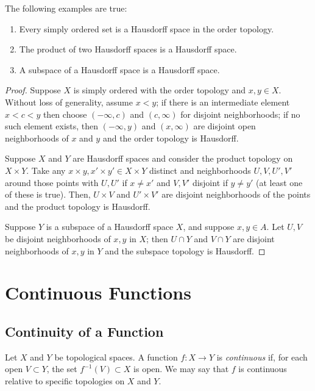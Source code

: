 \documentclass[10pt]{report}
\begin{document}
\begin{theorem}
  The following examples are true:
  \begin{enumerate}[label={(\alph*)}]
    \item Every simply ordered set is a Hausdorff space in the order topology.
    \item The product of two Hausdorff spaces is a Hausdorff space.
    \item A subspace of a Hausdorff space is a Hausdorff space.
 \end{enumerate}
\end{theorem}
\begin{proof}
  Suppose $X$ is simply ordered with the order topology and $x,y \in X$.
  Without loss of generality, assume $x < y$; if there is an intermediate element $x < c < y$ then choose $(-\infty,c)$ and $(c,\infty)$ for disjoint neighborhoods; if no such element exists, then $(-\infty,y)$ and $(x,\infty)$ are disjoint open neighborhoods of $x$ and $y$ and the order topology is Hausdorff.

  Suppose $X$ and $Y$ are Hausdorff spaces and consider the product topology on $X \times Y$.
  Take any $x \times y , x' \times y' \in X \times Y$ distinct and neighborhoods $U,V,U',V'$ around those points with $U,U'$ if $x \neq x'$ and $V,V'$ disjoint if $y \neq y'$ (at least one of these is true).
  Then, $U \times V$ and $U' \times V'$ are disjoint neighborhoods of the points and the product topology is Hausdorff.

  Suppose $Y$ is a subspace of a Hausdorff space $X$, and suppose $x,y \in A$.
  Let $U,V$ be disjoint neighborhoods of $x,y$ in $X$;
  then $U \cap Y$ and $V \cap Y$ are disjoint neighborhoods of $x,y$ in $Y$ and the subspace topology is Hausdorff.
\end{proof}

\newpage
\section{Continuous Functions}
\subsection{Continuity of a Function}
\begin{definition}
  Let $X$ and $Y$ be topological spaces.
  A function $f:X \rightarrow Y$ is \emph{continuous} if, for each open $V \subset Y$, the set $f^{-1}(V) \subset X$ is open.
  We may say that $f$ is continuous relative to specific topologies on $X$ and $Y$.
\end{definition}
\end{document}
